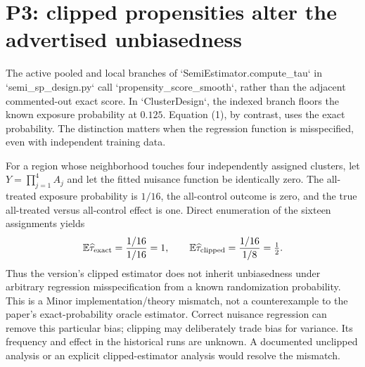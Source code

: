 \documentclass[10pt]{article}
\begin{document}
\section*{P3: clipped propensities alter the advertised unbiasedness}
The active pooled and local branches of `SemiEstimator.compute\_tau` in `semi\_sp\_design.py` call `propensity\_score\_smooth`, rather than the adjacent commented-out exact score. In `ClusterDesign`, the indexed branch floors the known exposure probability at \(0.125\). Equation (1), by contrast, uses the exact probability. The distinction matters when the regression function is misspecified, even with independent training data.\par
For a region whose neighborhood touches four independently assigned clusters, let \(Y=\prod_{j=1}^4 A_j\) and let the fitted nuisance function be identically zero. The all-treated exposure probability is \(1/16\), the all-control outcome is zero, and the true all-treated versus all-control effect is one. Direct enumeration of the sixteen assignments yields \[\mathbb E\widehat\tau_{\rm exact}=\frac{1/16}{1/16}=1,
 \qquad \mathbb E\widehat\tau_{\rm clipped}=\frac{1/16}{1/8}=\tfrac12.\] Thus the version’s clipped estimator does not inherit unbiasedness under arbitrary regression misspecification from a known randomization probability. This is a Minor implementation/theory mismatch, not a counterexample to the paper’s exact-probability oracle estimator. Correct nuisance regression can remove this particular bias; clipping may deliberately trade bias for variance. Its frequency and effect in the historical runs are unknown. A documented unclipped analysis or an explicit clipped-estimator analysis would resolve the mismatch.\par
\end{document}
